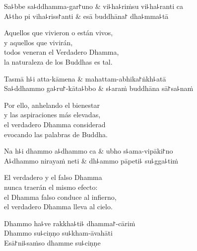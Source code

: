 \begin{twochants}
  Sa꜕bbe sa꜕ddhamma-gar꜓uno & vi꜕ha꜕riṁsu vi꜕ha꜕ranti ca \\
  A꜕tho pi viha꜕riss꜓anti & esā buddhāna꜓ dha꜕mma꜕tā \\
\end{twochants}

\begin{english}
  Aquellos que vivieron o están vivos,\\
  y aquellos que vivirán,\\
  todos veneran el Verdadero Dhamma,\\
  la naturaleza de los Buddhas es tal.
\end{english}

\begin{twochants}
  Tasmā h꜕i atta-kāmena & mahattam-abhika꜓ṅkh꜕atā \\
  Sa꜕ddhammo ga꜕ru꜓-kāta꜕bbo & s꜕araṁ buddhāna sā꜓sa꜕naṁ \\
\end{twochants}

\begin{english}
  Por ello, anhelando el bienestar\\
  y las aspiraciones más elevadas,\\
  el verdadero Dhamma considerad\\
  evocando las palabras de Buddha.
\end{english}

\clearpage

\begin{twochants}
  Na h꜕i dhammo a꜕dhammo ca & ubho s꜕ama-vipāki꜓no \\
  A꜕dhammo nirayaṁ neti & dh꜕ammo pāpeti꜕ su꜕gga꜕tiṁ \\
\end{twochants}

\begin{english}
  El verdadero  y el falso Dhamma\\
  nunca traerán el mismo efecto:\\
  el Dhamma falso conduce al infierno,\\
  el verdadero Dhamma lleva al cielo.
\end{english}

Dhammo ha꜕ve rakkha꜕ti꜕ dhamma꜓-cāriṁ\\
Dhammo su꜕ciṇṇo su꜕kham-āvahāti\\
Esā꜓ni꜕saṁso dhamme su꜕ciṇṇe


